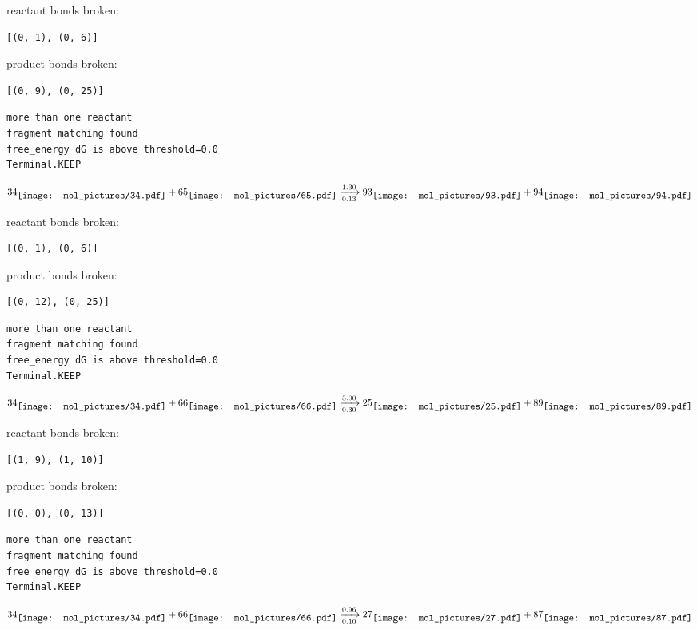 \documentclass{article}
\begin{document}
reactant bonds broken:\begin{verbatim}
[(0, 1), (0, 6)]
\end{verbatim}
product bonds broken:\begin{verbatim}
[(0, 9), (0, 25)]
\end{verbatim}




\vspace{1cm}
\begin{verbatim}
more than one reactant
fragment matching found
free_energy dG is above threshold=0.0
Terminal.KEEP
\end{verbatim}
$$
34
\raisebox{-.5\height}{\texttt{[image: mol\_pictures/34.pdf]}}
+
65
\raisebox{-.5\height}{\texttt{[image: mol\_pictures/65.pdf]}}
\xrightarrow[0.13]{1.30}
93
\raisebox{-.5\height}{\texttt{[image: mol\_pictures/93.pdf]}}
+
94
\raisebox{-.5\height}{\texttt{[image: mol\_pictures/94.pdf]}}
$$


reactant bonds broken:\begin{verbatim}
[(0, 1), (0, 6)]
\end{verbatim}
product bonds broken:\begin{verbatim}
[(0, 12), (0, 25)]
\end{verbatim}




\vspace{1cm}
\begin{verbatim}
more than one reactant
fragment matching found
free_energy dG is above threshold=0.0
Terminal.KEEP
\end{verbatim}
$$
34
\raisebox{-.5\height}{\texttt{[image: mol\_pictures/34.pdf]}}
+
66
\raisebox{-.5\height}{\texttt{[image: mol\_pictures/66.pdf]}}
\xrightarrow[0.30]{3.00}
25
\raisebox{-.5\height}{\texttt{[image: mol\_pictures/25.pdf]}}
+
89
\raisebox{-.5\height}{\texttt{[image: mol\_pictures/89.pdf]}}
$$


reactant bonds broken:\begin{verbatim}
[(1, 9), (1, 10)]
\end{verbatim}
product bonds broken:\begin{verbatim}
[(0, 0), (0, 13)]
\end{verbatim}




\vspace{1cm}
\begin{verbatim}
more than one reactant
fragment matching found
free_energy dG is above threshold=0.0
Terminal.KEEP
\end{verbatim}
$$
34
\raisebox{-.5\height}{\texttt{[image: mol\_pictures/34.pdf]}}
+
66
\raisebox{-.5\height}{\texttt{[image: mol\_pictures/66.pdf]}}
\xrightarrow[0.10]{0.96}
27
\raisebox{-.5\height}{\texttt{[image: mol\_pictures/27.pdf]}}
+
87
\raisebox{-.5\height}{\texttt{[image: mol\_pictures/87.pdf]}}
$$
\end{document}
